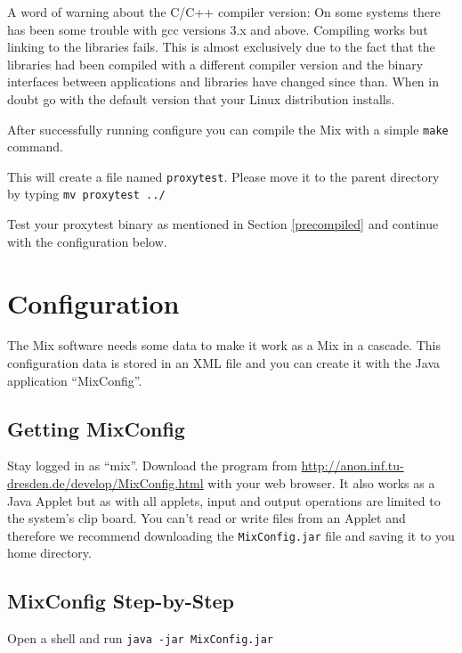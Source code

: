 \documentclass{article}
\begin{document}
A word of warning about the C/C++ compiler version: On some systems
there has been some trouble with gcc versions 3.x and above. Compiling
works but linking to the libraries fails. This is almost exclusively
due to the fact that the libraries had been compiled with a different
compiler version and the binary interfaces between applications and
libraries have changed since than. When in doubt go with the
default version that your Linux distribution installs.

After successfully running configure you can compile the Mix with a simple 
\verb|make| command.

This will create a file named \verb|proxytest|. Please move it to the
parent directory by typing \verb|mv proxytest ../|

Test your proxytest binary as mentioned in Section \ref{precompiled} and continue 
with the configuration below.


\section{Configuration} 


The Mix software needs some data to make it work as a Mix in a
cascade. This configuration data is stored in an XML file and you can
create it with the Java application ``MixConfig''.

\subsection{Getting MixConfig}

Stay logged in as ``mix''. Download the program from
\url{http://anon.inf.tu-dresden.de/develop/MixConfig.html} with your
web browser. It also works as a Java Applet but as with all applets,
input and output operations are limited to the system's clip board.
You can't read or write files from an Applet and therefore we recommend
downloading the \verb|MixConfig.jar| file and saving it to you home
directory.

\subsection{MixConfig Step-by-Step}

Open a shell and run \verb|java -jar MixConfig.jar|
\end{document}
